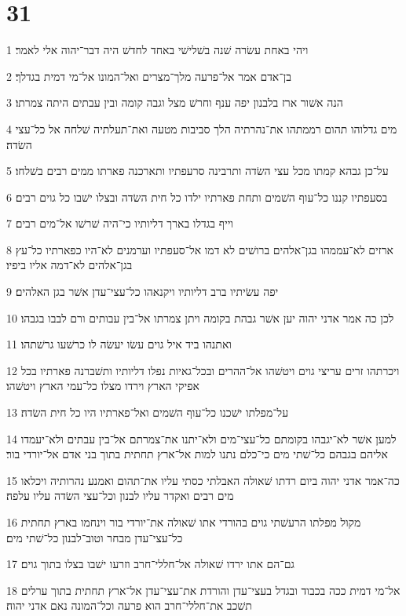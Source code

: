 \chapter{31}

\par 1 ויהי באחת עשׂרה שׁנה בשׁלישׁי באחד לחדשׁ היה דבר־יהוה אלי לאמר׃
\par 2 בן־אדם אמר אל־פרעה מלך־מצרים ואל־המונו אל־מי דמית בגדלך׃
\par 3 הנה אשׁור ארז בלבנון יפה ענף וחרשׁ מצל וגבה קומה ובין עבתים היתה צמרתו׃
\par 4 מים גדלוהו תהום רממתהו את־נהרתיה הלך סביבות מטעה ואת־תעלתיה שׁלחה אל כל־עצי השׂדה׃
\par 5 על־כן גבהא קמתו מכל עצי השׂדה ותרבינה סרעפתיו ותארכנה פארתו ממים רבים בשׁלחו׃
\par 6 בסעפתיו קננו כל־עוף השׁמים ותחת פארתיו ילדו כל חית השׂדה ובצלו ישׁבו כל גוים רבים׃
\par 7 וייף בגדלו בארך דליותיו כי־היה שׁרשׁו אל־מים רבים׃
\par 8 ארזים לא־עממהו בגן־אלהים ברושׁים לא דמו אל־סעפתיו וערמנים לא־היו כפארתיו כל־עץ בגן־אלהים לא־דמה אליו ביפיו׃
\par 9 יפה עשׂיתיו ברב דליותיו ויקנאהו כל־עצי־עדן אשׁר בגן האלהים׃
\par 10 לכן כה אמר אדני יהוה יען אשׁר גבהת בקומה ויתן צמרתו אל־בין עבותים ורם לבבו בגבהו׃
\par 11 ואתנהו ביד איל גוים עשׂו יעשׂה לו כרשׁעו גרשׁתהו׃
\par 12 ויכרתהו זרים עריצי גוים ויטשׁהו אל־ההרים ובכל־גאיות נפלו דליותיו ותשׁברנה פארתיו בכל אפיקי הארץ וירדו מצלו כל־עמי הארץ ויטשׁהו׃
\par 13 על־מפלתו ישׁכנו כל־עוף השׁמים ואל־פארתיו היו כל חית השׂדה׃
\par 14 למען אשׁר לא־יגבהו בקומתם כל־עצי־מים ולא־יתנו את־צמרתם אל־בין עבתים ולא־יעמדו אליהם בגבהם כל־שׁתי מים כי־כלם נתנו למות אל־ארץ תחתית בתוך בני אדם אל־יורדי בור׃
\par 15 כה־אמר אדני יהוה ביום רדתו שׁאולה האבלתי כסתי עליו את־תהום ואמנע נהרותיה ויכלאו מים רבים ואקדר עליו לבנון וכל־עצי השׂדה עליו עלפה׃
\par 16 מקול מפלתו הרעשׁתי גוים בהורדי אתו שׁאולה את־יורדי בור וינחמו בארץ תחתית כל־עצי־עדן מבחר וטוב־לבנון כל־שׁתי מים׃
\par 17 גם־הם אתו ירדו שׁאולה אל־חללי־חרב וזרעו ישׁבו בצלו בתוך גוים׃
\par 18 אל־מי דמית ככה בכבוד ובגדל בעצי־עדן והורדת את־עצי־עדן אל־ארץ תחתית בתוך ערלים תשׁכב את־חללי־חרב הוא פרעה וכל־המונה נאם אדני יהוה׃

